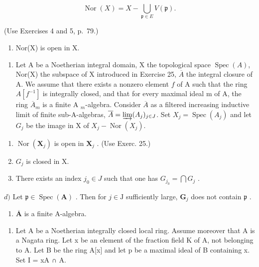 \[
\operatorname{Nor} (X) = X - \bigcup_ {\mathfrak {p} \in E} V (\mathfrak {p}).
\]

(Use Exercises 4 and 5, p.~79.)

\begin{enumerate}
\def\labelenumi{\alph{enumi})}
\setcounter{enumi}{2}
\tightlist
\item
  Nor(X) is open in X.
\end{enumerate}

\begin{enumerate}
\def\labelenumi{\arabic{enumi})}
\setcounter{enumi}{25}
\tightlist
\item
  Let A be a Noetherian integral domain, X the topological space \(\operatorname{Spec}(A)\), Nor(X) the subspace of X introduced in Exercise 25, \(\overline{A}\) the integral closure of A. We assume that there exists a nonzero element \(f\) of A such that the ring \(A[f^{-1}]\) is integrally closed, and that for every maximal ideal m of A, the ring \(\overline{A}_{m}\) is a finite A \(_{m}\)-algebra. Consider \(\overline{A}\) as a filtered increasing inductive limit of finite sub-A-algebras, \(\overline{A} = \varinjlim(A_{j})_{j\in J}\). Set \(X_{j} = \operatorname{Spec}(A_{j})\) and let \(G_{j}\) be the image in X of \(X_{j} - \operatorname{Nor}(X_{j})\).
\end{enumerate}

\begin{enumerate}
\def\labelenumi{\alph{enumi})}
\item
  \(\operatorname{Nor}(\mathbf{X}_j)\) is open in \(\mathbf{X}_j\) . (Use Exerc. 25.)
\item
  \(G_{j}\) is closed in X.
\item
  There exists an index \(j_0 \in J\) such that one has \(G_{j_0} = \bigcap G_j\) .
\end{enumerate}

\(d)\) Let \(\mathfrak{p} \in \operatorname{Spec}(\mathbf{A})\) . Then for \(j \in \mathrm{J}\) sufficiently large, \(\mathbf{G}_j\) does not contain \(\mathfrak{p}\) .

\begin{enumerate}
\def\labelenumi{\alph{enumi})}
\setcounter{enumi}{4}
\tightlist
\item
  \(\overline{\mathbf{A}}\) is a finite A-algebra.
\end{enumerate}

\begin{enumerate}
\def\labelenumi{\arabic{enumi})}
\setcounter{enumi}{26}
\tightlist
\item
  Let A be a Noetherian integrally closed local ring. Assume moreover that A is a Nagata ring. Let x be an element of the fraction field K of A, not belonging to A. Let B be the ring A{[}x{]} and let p be a maximal ideal of B containing x. Set I = xA ∩ A.
\end{enumerate}

